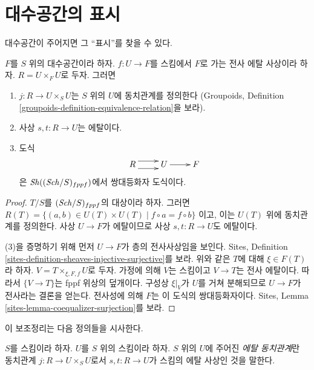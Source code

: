 \section{대수공간의 표시}
\label{section-presentations}

\noindent
대수공간이 주어지면 그 ``표시''를 찾을 수 있다.


\begin{lemma}
\label{lemma-space-presentation}
$F$를 $S$ 위의 대수공간이라 하자. $f : U \to F$를 스킴에서
$F$로 가는 전사 에탈 사상이라 하자. $R = U \times_F U$로 두자.
그러면
\begin{enumerate}
\item $j : R \to U \times_S U$는 $S$ 위의 $U$에 동치관계를 정의한다
(Groupoids, Definition \ref{groupoids-definition-equivalence-relation}을
보라).
\item 사상 $s, t : R \to U$는 에탈이다.
\item 도식
$$
\xymatrix{
R \ar@<1ex>[r] \ar@<-1ex>[r] &
U \ar[r] &
F
}
$$
은 $\mathop{\mathit{Sh}}\nolimits((\mathit{Sch}/S)_{fppf})$에서 쌍대등화자 도식이다.
\end{enumerate}
\end{lemma}

\begin{proof}
$T/S$를 $(\mathit{Sch}/S)_{fppf}$의 대상이라 하자.
그러면
$R(T) = \{(a, b) \in U(T) \times U(T) \mid f \circ a = f \circ b\}$
이고, 이는 $U(T)$ 위에 동치관계를 정의한다.
사상 $U \to F$가 에탈이므로 사상 $s, t : R \to U$도 에탈이다.

\medskip\noindent
(3)을 증명하기 위해 먼저 $U \to F$가 층의 전사사상임을 보인다.
Sites, Definition \ref{sites-definition-sheaves-injective-surjective}를
보라. 위와 같은 $T$에 대해 $\xi \in F(T)$라 하자.
$V = T \times_{\xi, F, f}U$로 두자.
가정에 의해 $V$는 스킴이고 $V \to T$는 전사 에탈이다.
따라서 $\{V \to T\}$는 fppf 위상의 덮개이다.
구성상 $\xi|_V$가 $U$를 거쳐 분해되므로 $U \to F$가 전사라는 결론을
얻는다. 전사성에 의해 $F$는 이 도식의 쌍대등화자이다.
Sites, Lemma \ref{sites-lemma-coequalizer-surjection}를 보라.
\end{proof}

\noindent
이 보조정리는 다음 정의들을 시사한다.

\begin{definition}
\label{definition-etale-equivalence-relation}
$S$를 스킴이라 하자. $U$를 $S$ 위의 스킴이라 하자.
$S$ 위의 $U$에 주어진 {\it 에탈 동치관계}란 동치관계
$j : R \to U \times_S U$로서 $s, t : R \to U$가 스킴의 에탈
사상인 것을 말한다.
\end{definition}

